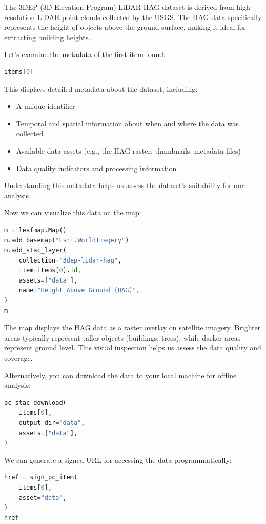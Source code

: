 The 3DEP (3D Elevation Program) LiDAR HAG dataset is derived from high-resolution LiDAR point clouds collected by the USGS. The HAG data specifically represents the height of objects above the ground surface, making it ideal for extracting building heights.

Let's examine the metadata of the first item found:

\begin{lstlisting}[language=Python]
items[0]
\end{lstlisting}

This displays detailed metadata about the dataset, including:

\begin{itemize}
\item A unique identifier
\item Temporal and spatial information about when and where the data was collected
\item Available data assets (e.g., the HAG raster, thumbnails, metadata files)
\item Data quality indicators and processing information
\end{itemize}

Understanding this metadata helps us assess the dataset's suitability for our analysis.

Now we can visualize this data on the map:

\begin{lstlisting}[language=Python]
m = leafmap.Map()
m.add_basemap("Esri.WorldImagery")
m.add_stac_layer(
    collection="3dep-lidar-hag",
    item=items[0].id,
    assets=["data"],
    name="Height Above Ground (HAG)",
)
m
\end{lstlisting}

The map displays the HAG data as a raster overlay on satellite imagery. Brighter areas typically represent taller objects (buildings, trees), while darker areas represent ground level. This visual inspection helps us assess the data quality and coverage.

Alternatively, you can download the data to your local machine for offline analysis:

\begin{lstlisting}[language=Python]
pc_stac_download(
    items[0],
    output_dir="data",
    assets=["data"],
)
\end{lstlisting}

We can generate a signed URL for accessing the data programmatically:

\begin{lstlisting}[language=Python]
href = sign_pc_item(
    items[0],
    asset="data",
)
href
\end{lstlisting}

